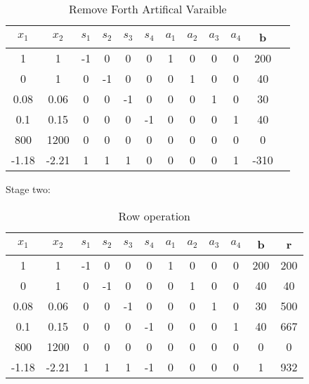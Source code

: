 \documentclass{article}
\begin{document}
  \begin{table}[H]
  \centering
  \caption{Remove Forth Artifical Varaible}
  \label{my-label}
  \begin{tabular}{|c|c|c|c|c|c|c|c|c|c|c|c|}
  \hline
  $x_1$ & $x_2$ & $s_1$  & $s_2$ & $s_3$ & $s_4$ & $a_1$ & $a_2$ & $a_3$ & $a_4$ & b  \\ \hline
  1    & 1    & -1       & 0    & 0    & 0    & 1    & 0    & 0    & 0 & 200 \\ \hline
  0    & 1    & 0        & -1   & 0    & 0    & 0    & 1    & 0    & 0 & 40  \\ \hline
  0.08 & 0.06 & 0        & 0    & -1   & 0    & 0    & 0    & 1    & 0 & 30  \\ \hline
  0.1  & 0.15 & 0        & 0    & 0    & -1   & 0    & 0    & 0    & 1 & 40  \\ \hline
  800  & 1200 & 0        & 0    & 0    & 0    & 0    & 0    & 0    & 0 & 0   \\ \hline
  -1.18 & -2.21  & 1     & 1    & 1    & 0    & 0    & 0    & 0    & 1 & -310   \\ \hline
  \end{tabular}
  \end{table}

  Stage two:

  \begin{table}[H]
  \centering
  \caption{Row operation}
  \label{my-label}
  \begin{tabular}{|c|c|c|c|c|c|c|c|c|c|c|c|}
  \hline
  $x_1$ & $x_2$ & $s_1$  & $s_2$ & $s_3$ & $s_4$ & $a_1$ & $a_2$ & $a_3$ & $a_4$ & b & r  \\ \hline
  1    & 1    & -1       & 0    & 0    & 0    & 1    & 0    & 0    & 0 & 200  & 200\\ \hline
  0    & 1    & 0        & -1   & 0    & 0    & 0    & 1    & 0    & 0 & 40   & 40\\ \hline
  0.08 & 0.06 & 0        & 0    & -1   & 0    & 0    & 0    & 1    & 0 & 30   & 500\\ \hline
  0.1  & 0.15 & 0        & 0    & 0    & -1   & 0    & 0    & 0    & 1 & 40   & 667\\ \hline
  800  & 1200 & 0        & 0    & 0    & 0    & 0    & 0    & 0    & 0 & 0    & 0\\ \hline
  -1.18 & -2.21  & 1     & 1    & 1    & -1   & 0    & 0    & 0    & 0    & 1 & 932   \\ \hline
  \end{tabular}
  \end{table}
\end{document}
